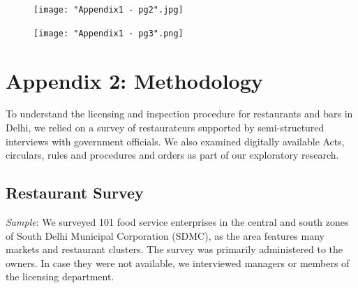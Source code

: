 \documentclass[a4paper, 12pt]{article}
\begin{document}
		\begin{figure}[H]
                    	\centering
                    	\texttt{[image: "Appendix1 - pg2".jpg]} 
		\end{figure}
		
		\begin{figure}[H]
                    	\centering
                    	\texttt{[image: "Appendix1 - pg3".png]} 
		\end{figure}
        
        
        
		\newpage
		\section*{Appendix 2: Methodology}
		\label {Appendix2}
		To understand the licensing and inspection procedure for restaurants and bars in Delhi, we relied on a survey of restaurateurs supported by semi-structured interviews with government officials. We also examined digitally available Acts, circulars, rules 
and procedures and orders as part of our exploratory research.
		
		\subsection* {Restaurant Survey}
		\textit{Sample}: We surveyed 101 food service enterprises in the central and south zones of South Delhi Municipal Corporation (SDMC), as the area features many markets and restaurant clusters. The survey was primarily administered to the owners. In 
case they were not available, we interviewed managers or members of the licensing department.
\end{document}
